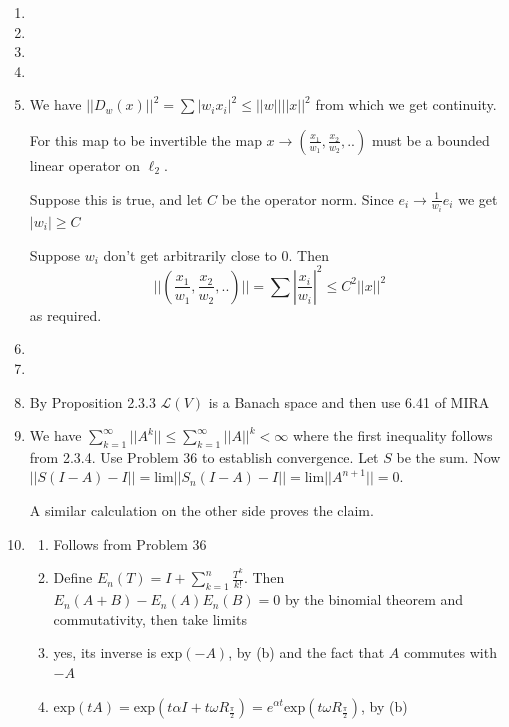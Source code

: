 \documentclass{article}
\newtheorem*{claim}{Claim}
\begin{document}
\begin{enumerate}
    \begin{claim}
        GL$_n(\mathbb{C})$ is path connected
    \end{claim}
    \item
    \item
    \item
    \item
    

    \item We have $||D_w(x)||^2=\sum|w_ix_i|^2 \leq ||w||||x||^2$ from which we get continuity.

    For this map to be invertible the map $x \to (\frac{x_1}{w_1},\frac{x_2}{w_2},..)$ must be a bounded linear operator on $\ell_2$.

    Suppose this is true, and let $C$ be the operator norm. Since $e_i \to \frac{1}{w_i}e_i$ we get $|w_i| \geq C$

    Suppose $w_i$ don't get arbitrarily close to $0$. Then \[||(\frac{x_1}{w_1},\frac{x_2}{w_2},..)||=\sum |\frac{x_i}{w_i}|^2 \leq C^2 ||x||^2\] as required.

    \item
    \item

    \item By Proposition 2.3.3 $\mathcal{L}(V)$ is a Banach space and then use 6.41 of MIRA

    \item We have $\sum_{k=1}^\infty ||A^k|| \leq \sum_{k=1}^\infty ||A||^k<\infty$ where the first inequality follows from 2.3.4. Use Problem 36 to establish convergence. Let $S$ be the sum. Now $||S(I-A)-I||=\text{lim}||S_n(I-A)-I||=\text{lim}||A^{n+1}||=0$. 
    
    A similar calculation on the other side proves the claim.

    \item \begin{enumerate}
        \item Follows from Problem 36
        
        \item Define $E_n(T)=I+\sum_{k=1}^n\frac{T^k}{k!}$. Then $E_n(A+B)-E_n(A)E_n(B)=0$ by the binomial theorem and commutativity, then take limits
        
        \item yes, its inverse is $\text{exp}(-A)$, by (b) and the fact that $A$ commutes with $-A$
        
        \item $\text{exp}(tA)=\text{exp}(t\alpha I+t\omega R_{\frac{\pi}{2}})=e^{\alpha t}\text{exp}(t\omega R_{\frac{\pi}{2}})$, by (b) 
        

\end{enumerate}
\end{enumerate}
\end{document}
